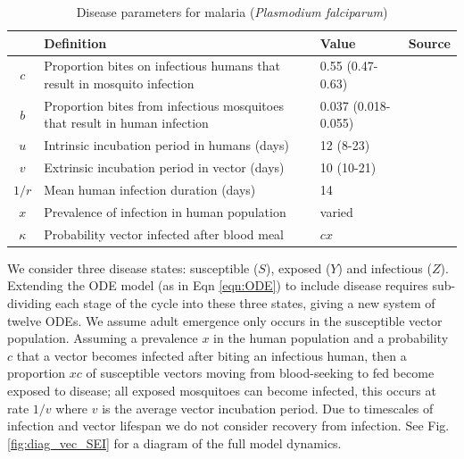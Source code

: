 \begin{table}[t]
\caption{Disease parameters for malaria (\textit{Plasmodium falciparum})}%
\vspace{.1cm}
\centering %
\begin{tabular}{|c|p{74mm}|p{32mm}|c|}%
\hline                        %
 & Definition & Value & Source \\ [0.5ex]%
\hline                  %
$c$ & Proportion bites on infectious humans that result in mosquito infection & 0.55 (0.47-0.63) & \cite{Smith2010} \\
$b$ & Proportion bites from infectious mosquitoes that result in human infection & 0.037 (0.018-0.055) & \cite{Killeen2000} \\
$u$ & Intrinsic incubation period in humans (days) & 12 (8-23) & \cite{Boyd1937} \\
$v$ & Extrinsic incubation period in vector (days) & 10 (10-21) & \cite{Gary2001}\\
$1/r$ & Mean human infection duration (days) & 14 & \cite{CDCMalaria} \\
$x$ & Prevalence of infection in human population & varied & \\
$\kappa$ & Probability  vector infected after blood meal & $cx$ & \\
[1ex]      %
\hline%
\end{tabular}
\label{table:param_malaria}%
\end{table}

We consider three disease states: susceptible ($S$), exposed ($Y$) and infectious ($Z$). Extending the ODE model (as in Eqn \ref{eqn:ODE}) to include disease requires sub-dividing each stage of the cycle into these three states, giving a new system of twelve ODEs. We assume adult emergence only occurs in the susceptible vector population. Assuming a prevalence $x$ in the human population and a probability $c$ that a vector becomes infected after biting an infectious human, then a proportion $xc$ of susceptible vectors moving from blood-seeking to fed become exposed to disease; all exposed mosquitoes can become infected, this occurs at rate $1/v$ where $v$ is the average vector incubation period. Due to timescales of infection and vector lifespan we do not consider recovery from infection. See Fig. \ref{fig:diag_vec_SEI} for a diagram of the full model dynamics.

